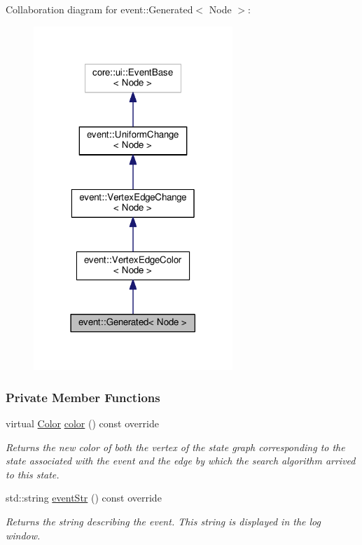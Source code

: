Collaboration diagram for event\+:\+:Generated$<$ Node $>$\+:\nopagebreak
\begin{figure}[H]
\begin{center}
\leavevmode
\includegraphics[width=213pt]{structevent_1_1Generated__coll__graph}
\end{center}
\end{figure}
\subsubsection*{Private Member Functions}
\begin{DoxyCompactItemize}
\item 
virtual \hyperlink{colors_8h_ab87bacfdad76e61b9412d7124be44c1c}{Color} \hyperlink{structevent_1_1Generated_a034cc627ec1fc3c92159f8282c400625}{color} () const override
\begin{DoxyCompactList}\small\item\em Returns the new color of both the vertex of the state graph corresponding to the state associated with the event and the edge by which the search algorithm arrived to this state. \end{DoxyCompactList}\item 
std\+::string \hyperlink{structevent_1_1Generated_a543a4c96bfc07541b2314d24d57e6813}{event\+Str} () const override
\begin{DoxyCompactList}\small\item\em Returns the string describing the event. This string is displayed in the log window. \end{DoxyCompactList}\end{DoxyCompactItemize}
